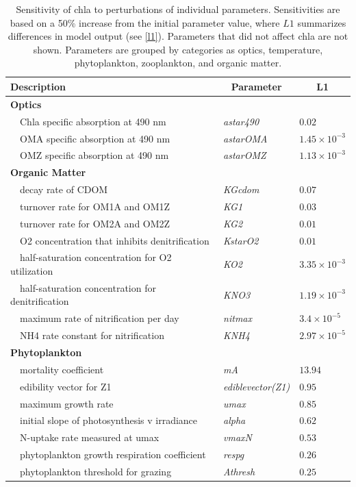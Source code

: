 \documentclass[review]{elsarticle}\usepackage[]{graphicx}\usepackage[]{color}
\begin{document}
\begin{table}[!tbp]
{\footnotesize
\caption{Sensitivity of \ac{chla} to perturbations of individual parameters.  Sensitivities are based on a 50\% increase from the initial parameter value, where $L1$ summarizes differences in model output (see \cref{l1}).  Parameters that did not affect \ac{chla} are not shown.  Parameters are grouped by categories as optics, temperature, phytoplankton, zooplankton, and organic matter.\label{tab:chlsens}} 
\begin{center}
\begin{tabular}{lll}
\hline\hline
\multicolumn{1}{l}{Description}&\multicolumn{1}{c}{Parameter}&\multicolumn{1}{c}{L1}\tabularnewline
\hline
{\bfseries Optics}&&\tabularnewline
~~Chla specific absorption at 490 nm&\textit{astar490}&$0.02$\tabularnewline
~~OMA specific absorption at 490 nm&\textit{astarOMA}&$1.45\times 10^{-3}$\tabularnewline
~~OMZ specific absorption at 490 nm&\textit{astarOMZ}&$1.13\times 10^{-3}$\tabularnewline
\hline
{\bfseries Organic Matter}&&\tabularnewline
~~decay rate of CDOM&\textit{KGcdom}&$0.07$\tabularnewline
~~turnover rate for OM1A and OM1Z&\textit{KG1}&$0.03$\tabularnewline
~~turnover rate for OM2A and OM2Z&\textit{KG2}&$0.01$\tabularnewline
~~O2 concentration that inhibits denitrification&\textit{KstarO2}&$0.01$\tabularnewline
~~half-saturation concentration for O2 utilization&\textit{KO2}&$3.35\times 10^{-3}$\tabularnewline
~~half-saturation concentration for denitrification&\textit{KNO3}&$1.19\times 10^{-3}$\tabularnewline
~~maximum rate of nitrification per day&\textit{nitmax}&$3.4\times 10^{-5}$\tabularnewline
~~NH4 rate constant for nitrification&\textit{KNH4}&$2.97\times 10^{-5}$\tabularnewline
\hline
{\bfseries Phytoplankton}&&\tabularnewline
~~mortality coefficient&\textit{mA}&$13.94$\tabularnewline
~~edibility vector for Z1&\textit{ediblevector(Z1)}&$0.95$\tabularnewline
~~maximum growth rate&\textit{umax}&$0.85$\tabularnewline
~~initial slope of photosynthesis v irradiance&\textit{alpha}&$0.62$\tabularnewline
~~N-uptake rate measured at umax&\textit{vmaxN}&$0.53$\tabularnewline
~~phytoplankton growth respiration coefficient&\textit{respg}&$0.26$\tabularnewline
~~phytoplankton threshold for grazing&\textit{Athresh}&$0.25$\tabularnewline

\end{tabular}
\end{center}}
\end{table}
\end{document}
